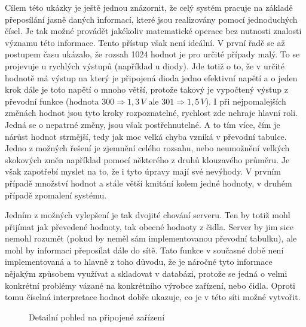 Cílem této ukázky je ještě jednou znázornit, že celý systém pracuje na základě přeposílání jasně daných informací, které jsou realizovány pomocí jednoduchých čísel. Je tak možné provádět jakékoliv matematické operace bez nutnosti znalosti významu této informace. Tento přístup však není i\-de\-ál\-ní. V první řadě se až postupem času ukázalo, že rozsah 1024 hodnot je pro určité případy malý. To se projevuje u rychlých výstupů (například u diody). Jde totiž o to, že v určité hodnotě má výstup na který je připojená dioda jedno efektivní napětí a o jeden krok dále je toto napětí o mnoho větší, protože takový je vypočtený výstup z převodní funkce (hodnota $300 \Rightarrow 1,3\,V$ ale $301 \Rightarrow 1,5\,V$). I při nejpomalejších změnách hodnot jsou tyto kroky rozpoznatelné, rychlost zde nehraje hlavní roli. Jedná se o nepatrné změny, jsou však postřehnutelné. A to tím více, čím je nárůst hodnot strmější, tedy jak moc velká chyba vzniká v převodní tabulce. Jedno z možných řešení je zjemnění celého rozsahu, nebo neumožnění velkých skokových změn například pomocí některého z druhů klouzavého průměru. Je však zapotřebí myslet na to, že i tyto úpravy mají své nevýhody. V prvním případě množství hodnot a stále větší kmitání kolem jedné hodnoty, v druhém případě zpomalení systému.

Jedním z možných vylepšení je tak dvojité chování serveru. Ten by totiž mohl přijímat jak převedené hodnoty, tak obecné hodnoty z čidla. Server by jim sice nemohl rozumět (pokud by neměl sám implementovanou převodní tabulku), ale mohl by informaci přeposílat dále do sítě. Tato funkce v současné době není implementovaná a to hlavně z toho důvodu, že je náročné tyto informace nějakým způsobem využívat a skladovat v databázi, protože se jedná o velmi konkrétní problémy vázané na konkrétního výrobce zařízení, nebo čidla. Oproti tomu číselná interpretace hodnot dobře ukazuje, co je v této síti možné vytvořit.

\begin{figure}[h]
    \centering
	\caption{Detailní pohled na připojené zařízení}
	\label{fig:speedy2}
\end{figure}

